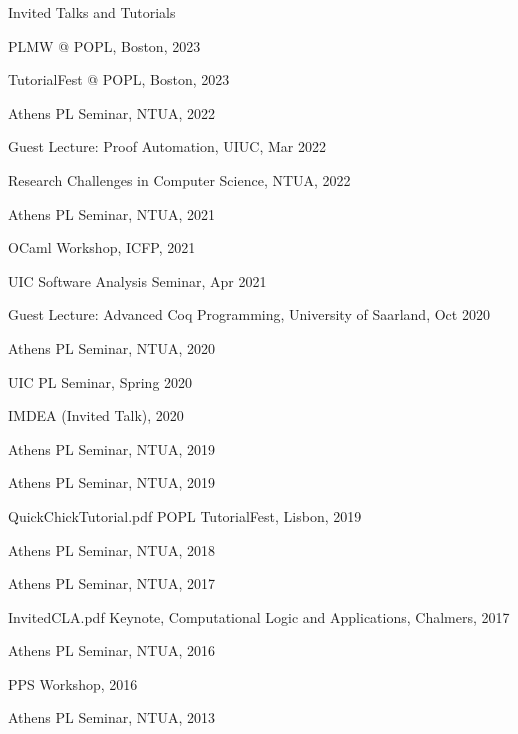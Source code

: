 \documentclass{resume} %
\begin{document}
\newcommand{\apls}[1]{Athens PL Seminar, NTUA, #1}

\begin{rSection}{Invited Talks and Tutorials}

     {}
     {PLMW @ POPL, Boston, 2023}

     {}
     {TutorialFest @ POPL, Boston, 2023}

     {}
     {Athens PL Seminar, NTUA, 2022}

     {}
     {Guest Lecture: Proof Automation, UIUC, Mar 2022}
     
     {}
     {Research Challenges in Computer Science, NTUA, 2022}

     {}
     {Athens PL Seminar, NTUA, 2021}

     {}
     {OCaml Workshop, ICFP, 2021}

     {}
     {UIC Software Analysis Seminar, Apr 2021}
     
     {}
     {Guest Lecture: Advanced Coq Programming, University of Saarland, Oct 2020}
     
     {}
     {Athens PL Seminar, NTUA, 2020}
     
     {}
     {UIC PL Seminar, Spring 2020}
  
     {}
     {IMDEA (Invited Talk), 2020}
  
     {}
     {Athens PL Seminar, NTUA, 2019}

    {}
    {\apls{2019}}
  
    {QuickChickTutorial.pdf}
    {POPL TutorialFest, Lisbon, 2019}

     {}
     {Athens PL Seminar, NTUA, 2018}

     {}
     {Athens PL Seminar, NTUA, 2017}

     {InvitedCLA.pdf}
     {Keynote, Computational Logic and Applications, Chalmers, 2017}

     {}
     {Athens PL Seminar, NTUA, 2016}

     {}
     {PPS Workshop, 2016}

     {}
     {Athens PL Seminar, NTUA, 2013}
     
\end{rSection}
\end{document}
